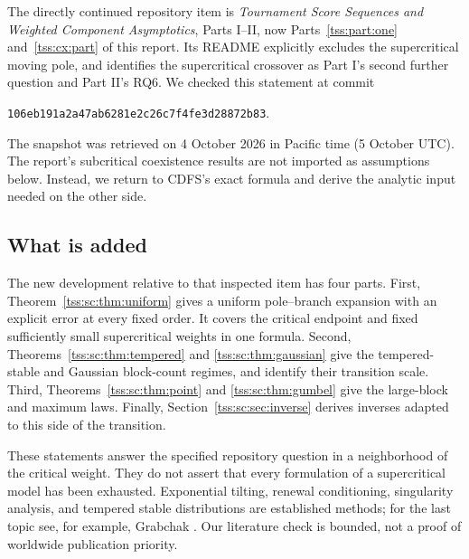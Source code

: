 \documentclass[11pt]{article}
\theoremstyle{remark}\newtheorem{remark}[theorem]{Remark}
\theoremstyle{definition}\newtheorem{definition}[theorem]{Definition}
\begin{document}
The directly continued repository item is \emph{Tournament Score Sequences and Weighted Component Asymptotics}, Parts I--II, now Parts~\ref{tss:part:one} and~\ref{tss:cx:part} of this report. Its README explicitly excludes the supercritical moving pole, and identifies the supercritical crossover as Part I's second further question and Part II's RQ6. We checked this statement at commit
\begin{center}
\texttt{106eb191a2a47ab6281e2c26c7f4fe3d28872b83}.
\end{center}
The snapshot was retrieved on 4 October 2026 in Pacific time (5 October UTC). The report's subcritical coexistence results are not imported as assumptions below. Instead, we return to CDFS's exact formula and derive the analytic input needed on the other side.

\subsection{What is added}
The new development relative to that inspected item has four parts. First, Theorem~\ref{tss:sc:thm:uniform} gives a uniform pole--branch expansion with an explicit error at every fixed order. It covers the critical endpoint and fixed sufficiently small supercritical weights in one formula. Second, Theorems~\ref{tss:sc:thm:tempered} and \ref{tss:sc:thm:gaussian} give the tempered-stable and Gaussian block-count regimes, and identify their transition scale. Third, Theorems~\ref{tss:sc:thm:point} and \ref{tss:sc:thm:gumbel} give the large-block and maximum laws. Finally, Section~\ref{tss:sc:sec:inverse} derives inverses adapted to this side of the transition.

These statements answer the specified repository question in a neighborhood of the critical weight. They do not assert that every formulation of a supercritical model has been exhausted. Exponential tilting, renewal conditioning, singularity analysis, and tempered stable distributions are established methods; for the last topic see, for example, Grabchak \cite{Grabchak}. Our literature check is bounded, not a proof of worldwide publication priority.
\end{document}
